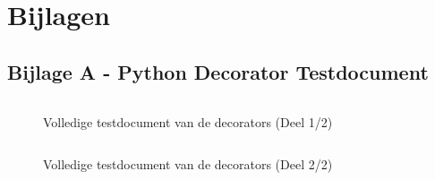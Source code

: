 \documentclass[a4paper]{report}
\begin{document}
\chapter{Bijlagen}
\section{Bijlage A - Python Decorator Testdocument}
\label{sec:bijlageA}
\begin{figure}[H]
    \inputminted[firstline=1, lastline=46,bgcolor=bg,linenos, breaklines]{Python}{Appendices/decorator_testdocument.py}
    \caption{Volledige testdocument van de decorators (Deel 1/2)}
  \label{fig:decorator_document}
\end{figure}
\begin{figure}[H]
    \inputminted[firstline=47, lastline=100,bgcolor=bg,linenos, breaklines]{Python}{Appendices/decorator_testdocument.py}

    \caption{Volledige testdocument van de decorators (Deel 2/2)}
  \label{fig:decorator_document2}
\end{figure}

% 

%         
\end{document}
